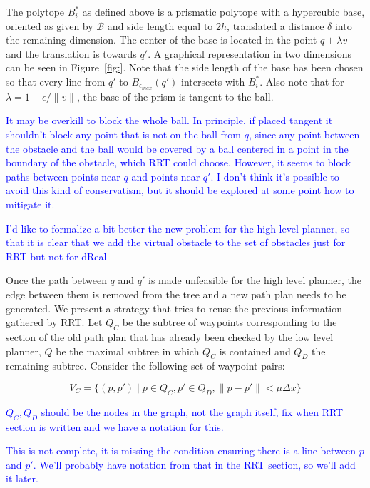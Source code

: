 \documentclass[12pt]{article}
\newcommand\fran[1]{\textcolor{blue}{#1}}
\begin{document}
The polytope $B^*_i$ as defined above is a prismatic polytope with a hypercubic base, oriented as given by $\mathcal{B}$ and side length equal to $2 h$, translated a distance $\delta$ into the remaining dimension. The center of the base is located in the point $q + \lambda v$ and the translation is towards $q'$. A graphical representation in two dimensions can be seen in Figure~\ref{fig:}. Note that the side length of the base has been chosen so that every line from $q'$ to $B_{\epsilon_{max}}(q')$ intersects with $B^*_i$. Also note that for $\lambda = 1 - \epsilon / \|v\|$, the base of the prism is tangent to the ball.

\fran{It may be overkill to block the whole ball. In principle, if placed tangent it shouldn't block any point that is not on the ball from $q$, since any point between the obstacle and the ball would be covered by a ball centered in a point in the boundary of the obstacle, which RRT could choose. However, it seems to block paths between points near $q$ and points near $q'$. I don't think it's possible to avoid this kind of conservatism, but it should be explored at some point how to mitigate it.}

\fran{I'd like to formalize a bit better the new problem for the high level planner, so that it is clear that we add the virtual obstacle to the set of obstacles just for RRT but not for dReal}

Once the path between $q$ and $q'$ is made unfeasible for the high level planner, the edge between them is removed from the tree and a new path plan needs to be generated. We present a strategy that tries to reuse the previous information gathered by RRT. Let $Q_C$ be the subtree of waypoints corresponding to the section of the old path plan that has already been checked by the low level planner, $Q$ be the maximal subtree in which $Q_C$ is contained and $Q_D$ the remaining subtree. Consider the following set of waypoint pairs:

\begin{equation}
    \label{eq:checked_candidates}
    V_C = \{(p, p') \mid p \in Q_C, p' \in Q_D, \|p - p'\| < \mu \Delta x\}
\end{equation}

\fran{$Q_C, Q_D$ should be the nodes in the graph, not the graph itself, fix when RRT section is written and we have a notation for this.}

\fran{This is not complete, it is missing the condition ensuring there is a line between $p$ and $p'$. We'll probably have notation from that in the RRT section, so we'll add it later.}
\end{document}
